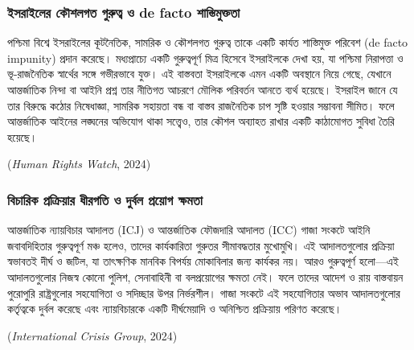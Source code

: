 \subsubsection{ইসরাইলের কৌশলগত গুরুত্ব ও de facto
শাস্তিমুক্ততা}\label{ux987ux9b8ux9b0ux987ux9b2ux9b0-ux995ux9b6ux9b2ux997ux9a4-ux997ux9b0ux9a4ux9ac-ux993-de-facto-ux9b6ux9b8ux9a4ux9aeux995ux9a4ux9a4}

পশ্চিমা বিশ্বে ইসরাইলের কূটনৈতিক, সামরিক ও কৌশলগত গুরুত্ব তাকে একটি কার্যত
শাস্তিমুক্ত পরিবেশ (de facto impunity) প্রদান করেছে। মধ্যপ্রাচ্যে একটি গুরুত্বপূর্ণ
মিত্র হিসেবে ইসরাইলকে দেখা হয়, যা পশ্চিমা নিরাপত্তা ও ভূ-রাজনৈতিক স্বার্থের
সঙ্গে গভীরভাবে যুক্ত। এই বাস্তবতা ইসরাইলকে এমন একটি অবস্থানে নিয়ে গেছে,
যেখানে আন্তর্জাতিক নিন্দা বা আইনি প্রশ্ন তার নীতিগত আচরণে মৌলিক পরিবর্তন আনতে
ব্যর্থ হয়েছে। ইসরাইল জানে যে তার বিরুদ্ধে কঠোর নিষেধাজ্ঞা, সামরিক সহায়তা বন্ধ
বা বাস্তব রাজনৈতিক চাপ সৃষ্টি হওয়ার সম্ভাবনা সীমিত। ফলে আন্তর্জাতিক আইনের
লঙ্ঘনের অভিযোগ থাকা সত্ত্বেও, তার কৌশল অব্যাহত রাখার একটি কাঠামোগত সুবিধা
তৈরি হয়েছে।

(\emph{Human Rights Watch}, 2024)

\vspace{0.3em}

\subsubsection{বিচারিক প্রক্রিয়ার ধীরগতি ও দুর্বল প্রয়োগ
ক্ষমতা}\label{ux9acux99aux9b0ux995-ux9aaux9b0ux995ux9b0ux9afux9b0-ux9a7ux9b0ux997ux9a4-ux993-ux9a6ux9b0ux9acux9b2-ux9aaux9b0ux9afux997-ux995ux9b7ux9aeux9a4}

আন্তর্জাতিক ন্যায়বিচার আদালত (ICJ) ও আন্তর্জাতিক ফৌজদারি আদালত (ICC) গাজা
সংকটে আইনি জবাবদিহিতার গুরুত্বপূর্ণ মঞ্চ হলেও, তাদের কার্যকারিতা গুরুতর
সীমাবদ্ধতার মুখোমুখি। এই আদালতগুলোর প্রক্রিয়া স্বভাবতই দীর্ঘ ও জটিল, যা তাৎক্ষণিক
মানবিক বিপর্যয় মোকাবিলার জন্য কার্যকর নয়। আরও গুরুত্বপূর্ণ হলো---এই আদালতগুলোর
নিজস্ব কোনো পুলিশ, সেনাবাহিনী বা বলপ্রয়োগের ক্ষমতা নেই। ফলে তাদের আদেশ ও রায়
বাস্তবায়ন পুরোপুরি রাষ্ট্রগুলোর সহযোগিতা ও সদিচ্ছার উপর নির্ভরশীল। গাজা সংকটে এই
সহযোগিতার অভাব আদালতগুলোর কর্তৃত্বকে দুর্বল করেছে এবং ন্যায়বিচারকে একটি
দীর্ঘমেয়াদি ও অনিশ্চিত প্রক্রিয়ায় পরিণত করেছে।

(\emph{International Crisis Group}, 2024)

\vspace{0.3em}

